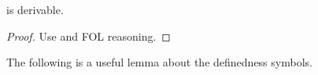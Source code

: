 \documentclass{amsart}
\begin{document}
\begin{lemma}
	\membershipexists is derivable.
\end{lemma}
\begin{proof}
	Use \propagationexists and FOL reasoning.
\end{proof}

\begin{comment}
\begin{lemma}
\label{lemma_P_implies_ceil_P}
$\varphi \imp \ceil{\varphi}$ is derivable.
\end{lemma}
\begin{proof}
Let $x$ be a variable that does not occur free in $\varphi$.
\begin{center}
\begin{tabular}{l|ll}
	1 & $\ceil{x}$ & definedness axiom \\
	2 & $x \imp (x \wedge \neg \varphi) \vee \varphi$
	  & propositional tautology \\
	3 & $\ceil{x} \imp \ceil{(x \wedge \neg \varphi) \vee \varphi}$
	  & by 2, \framing \\
	4 & $\ceil{(x \wedge \neg \varphi) \vee \varphi}$
	  & by 1 and 3, \modusponens \\
	5 & $\ceil{x \wedge \neg \varphi} \vee \ceil{\varphi}$
	  & by 4, \Prop{prop_propgation_of_symbol_application} \\
	6 & $\neg \ceil{x \wedge \neg \varphi} \imp \ceil{\varphi}$
	  & by 5, FOL reasoning \\
	7 & $(x \wedge \varphi) \imp \neg \ceil{x \wedge \neg \varphi}$
	  & by \singletonvariable and FOL reasoning \\
	8 & $x \wedge \varphi \imp \ceil{\varphi}$
	  & by 7 and 6, FOL reasoning \\
	9 & $x \imp (\varphi \imp \ceil{\varphi})$
	  & by 8, FOL reasoning \\
	10& $\forall x . (x \imp (\varphi \imp \ceil{\varphi}))$
	  & by 9, \universalgeneralization \\
	11& $(\exists x . x) \imp (\varphi \imp \ceil{\varphi})$
	  & by 10, FOL reasoning \\
	12& $\exists x . x$
	  & by \existence \\
	13& $\varphi \imp \ceil{\varphi}$
	  & by 12 and 11, \modusponens
\end{tabular}
\end{center}
\end{proof}
\end{comment}

The following is a useful lemma about the definedness symbols.
\end{document}
